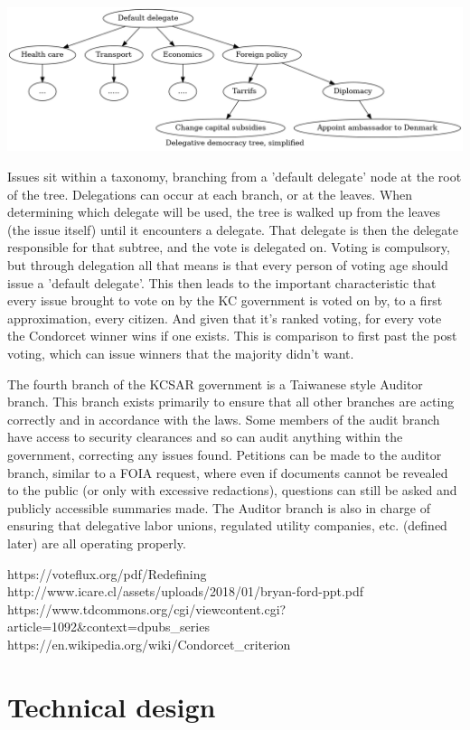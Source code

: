 \documentclass[10pt]{article}
\begin{document}
\includegraphics[width=1\textwidth]{fig_del_democracy_tree.png}

Issues sit within a taxonomy, branching from a 'default delegate' node at the root of the tree. Delegations can occur at each branch, or at the leaves. When determining which delegate will be used, the tree is walked up from the leaves (the issue itself) until it encounters a delegate. That delegate is then the delegate responsible for that subtree, and the vote is delegated on. Voting is compulsory, but through delegation all that means is that every person of voting age should issue a 'default delegate'. This then leads to the important characteristic that every issue brought to vote on by the KC government is voted on by, to a first approximation, every citizen. And given that it's ranked voting, for every vote the Condorcet winner wins if one exists. This is comparison to first past the post voting, which can issue winners that the majority didn't want.

The fourth branch of the KCSAR government is a Taiwanese style Auditor branch. This branch exists primarily to ensure that all other branches are acting correctly and in accordance with the laws. Some members of the audit branch have access to security clearances and so can audit anything within the government, correcting any issues found. Petitions can be made to the auditor branch, similar to a FOIA request, where even if documents cannot be revealed to the public (or only with excessive redactions), questions can still be asked and publicly accessible summaries made. The Auditor branch is also in charge of ensuring that delegative labor unions, regulated utility companies, etc. (defined later) are all operating properly.



https://voteflux.org/pdf/Redefining%
http://www.icare.cl/assets/uploads/2018/01/bryan-ford-ppt.pdf
https://www.tdcommons.org/cgi/viewcontent.cgi?article=1092&context=dpubs_series
https://en.wikipedia.org/wiki/Condorcet_criterion

\section*{Technical design}
\end{document}
